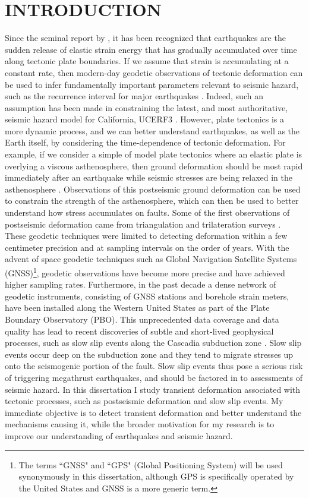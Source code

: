 \chapter{INTRODUCTION}
Since the seminal report by \citet{Reid1910}, it has been recognized that earthquakes are the sudden release of elastic strain energy that has gradually accumulated over time along tectonic plate boundaries. If we assume that strain is accumulating at a constant rate, then modern-day geodetic observations of tectonic deformation can be used to infer fundamentally important parameters relevant to seismic hazard, such as the recurrence interval for major earthquakes \citep[e.g.,][]{Savage1973,Meade2005}. Indeed, such an assumption has been made in constraining the latest, and most authoritative, seismic hazard model for California, UCERF3 \citep{Field2014}. However, plate tectonics is a more dynamic process, and we can better understand earthquakes, as well as the Earth itself, by considering the time-dependence of tectonic deformation. For example, if we consider a simple of model plate tectonics where an elastic plate is overlying a viscous asthenosphere, then ground deformation should be most rapid immediately after an earthquake while seismic stresses are being relaxed in the asthenosphere \citep{Nur1974,Savage1978}. Observations of this postseismic ground deformation can be used to constrain the strength of the asthenosphere, which can then be used to better understand how stress accumulates on faults. Some of the first observations of postseismic deformation came from triangulation and trilateration surveys \citep[e.g,][]{Thatcher1983}. These geodetic techniques were limited to detecting deformation within a few centimeter precision and at sampling intervals on the order of years. With the advent of space geodetic techniques such as Global Navigation Satellite Systems (GNSS)\footnote{The terms ``GNSS" and ``GPS" (Global Positioning System) will be used synonymously in this dissertation, although GPS is specifically operated by the United States and GNSS is a more generic term.}, geodetic observations have become more precise and have achieved higher sampling rates. Furthermore, in the past decade a dense network of geodetic instruments, consisting of GNSS stations and borehole strain meters, have been installed along the Western United States as part of the Plate Boundary Observatory (PBO). This unprecedented data coverage and data quality has lead to recent discoveries of subtle and short-lived geophysical processes, such as slow slip events along the Cascadia subduction zone \citep{Dragert2001}. Slow slip events occur deep on the subduction zone and they tend to migrate stresses up onto the seismogenic portion of the fault. Slow slip events thus pose a serious risk of triggering megathrust earthquakes, and should be factored in to assessments of seismic hazard. In this dissertation I study transient deformation associated with tectonic processes, such as postseismic deformation and slow slip events. My immediate objective is to detect transient deformation and better understand the mechanisms causing it, while the broader motivation for my research is to improve our understanding of earthquakes and seismic hazard. 

